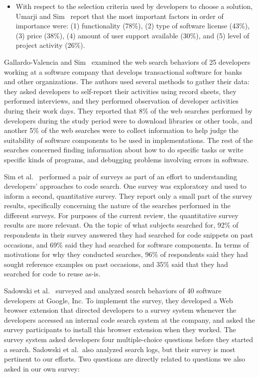 \documentclass{casicswhitepaper}
\begin{document}
\begin{itemize}
\item With respect to the selection criteria used by developers to choose a solution, Umarji and Sim~\cite{umarji_2013} report that the most important factors in order of importance were: (1) functionality (78\%), (2) type of software license (43\%), (3) price (38\%), (4) amount of user support available (30\%), and (5) level of project activity (26\%).

\end{itemize}

Gallardo-Valencia and Sim~\cite{gallardo2011kinds} examined the web search behaviors of 25 developers working at a software company that develops transactional software for banks and other organizations.  The authors used several methods to gather their data: they asked developers to self-report their activities using record sheets, they performed interviews, and they performed observation of developer activities during their work days.  They reported that 8\% of the web searches performed by developers during the study period were to download libraries or other tools, and another 5\% of the web searches were to collect information to help judge the suitability of software components to be used in implementations.  The rest of the searches concerned finding information about how to do specific tasks or write specific kinds of programs, and debugging problems involving errors in software.

Sim et al.~\cite{sim2012software} performed a pair of surveys as part of an effort to understanding developers' approaches to code search.  One survey was exploratory and used to inform a second, quantitative survey.  They report only a small part of the survey results, specifically concerning the nature of the searches performed in the different surveys.  For purposes of the current review, the quantitative survey results are more relevant.  On the topic of what subjects searched for, 92\% of respondents in their survey answered they had searched for code snippets on past occasions, and 69\% said they had searched for software components.  In terms of motivations for why they conducted searches, 96\% of respondents said they had sought reference examples on past occasions, and 35\% said that they had searched for code to reuse as-is.

Sadowski et al.~\cite{sadowski2015developers} surveyed and analyzed search behaviors of 40 software developers at Google, Inc.  To  implement the survey, they developed a Web browser extension that directed developers to a survey system whenever the developers accessed an internal code search system at the company, and asked the survey participants to install this browser extension when they worked.  The survey system asked developers four multiple-choice questions before they started a search.  Sadowski et al.\ also analyzed search logs, but their survey is most pertinent to our efforts.  Two questions are directly related to questions we also asked in our own survey:
\end{document}
